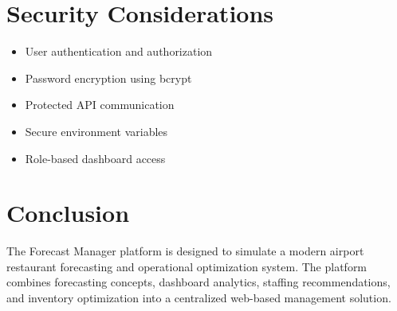 \documentclass[12pt]{article}
\begin{document}
\section{Security Considerations}

\begin{itemize}
\item User authentication and authorization
\item Password encryption using bcrypt
\item Protected API communication
\item Secure environment variables
\item Role-based dashboard access
\end{itemize}

\section{Conclusion}

The Forecast Manager platform is designed to simulate a modern airport restaurant forecasting and operational optimization system. The platform combines forecasting concepts, dashboard analytics, staffing recommendations, and inventory optimization into a centralized web-based management solution.
\end{document}
